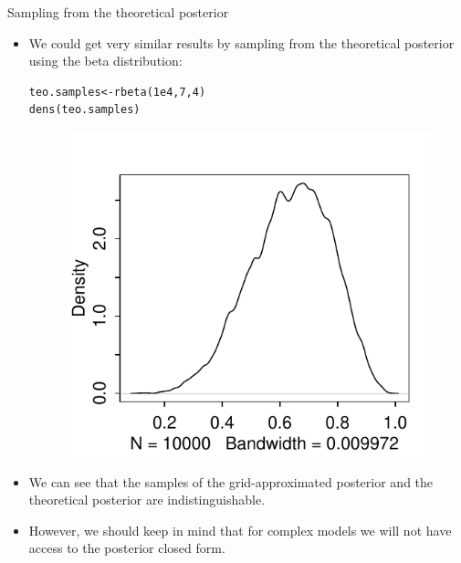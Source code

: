 \documentclass[handout]{beamer}
\begin{document}
\begin{frame}[fragile]{Sampling from the theoretical posterior}
\scriptsize{
\begin{itemize}

\item We could get very similar results by sampling from the theoretical posterior using the beta distribution: 

\begin{verbatim}
teo.samples<-rbeta(1e4,7,4)
dens(teo.samples)
\end{verbatim}



   \begin{figure}[h!]
	\centering
	\includegraphics[scale=0.6]{pics/posteriorTossBeta.pdf}
	\end{figure} 

	
\item We can see that the samples of the grid-approximated posterior and the theoretical posterior are indistinguishable.
	

\item However, we should keep in mind that for complex models we will not have access to the posterior closed form.
\end{itemize}



} 

\end{frame}
\end{document}
